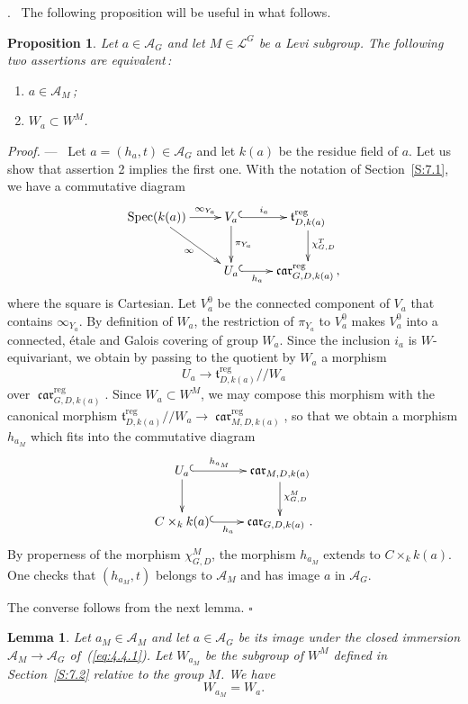\documentclass[12pt,a4paper,oneside,english,leqno]{smfart}
\makeatletter
\numberwithin{equation}{subsection}
\newcounter{theo}
\numberwithin{theo}{subsection}
\newenvironment{paragr}[1][]{\medskip\refstepcounter{subsection}%
  \par\noindent\hspace*{\parindent}\thesubsection.\ \emph{#1}%
  \@ifundefined{@empty}{}{}\ignorespaces}{\medskip}
\theoremstyle{plain}
\newtheorem{lemma}[theo]{Lemma}
\newtheorem{proposition}[theo]{Proposition}
\theoremstyle{definition}
\theoremstyle{remark}
\newenvironment{preuve}[1][]{\medskip\noindent\textit{Proof.} #1 ---\ }%
  {\hfill\ensuremath{\square}\medskip}
\DeclareMathOperator{\reg}{reg}
\DeclareMathOperator{\Spec}{Spec}
\DeclareMathOperator{\car}{\mathfrak{car}}
\newcommand{\lc}{\mathcal{L}}
\newcommand{\Ac}{\mathcal{A}}
\newcommand{\tgo}{\mathfrak{t}}
\makeatother
\begin{document}
\begin{paragr}\label{S:8.2}
The following proposition will be useful in what follows.

\begin{proposition}\label{thm:8.2.1}
Let $a\in\Ac_G$ and let $M\in\lc^G$ be a Levi subgroup. The following two assertions are equivalent\,:
\begin{enumerate}
\item $a\in\Ac_M$\,; \item $W_a\subset W^M$.
\end{enumerate}
\end{proposition}

\begin{preuve}
Let $a=(h_a,t)\in\Ac_G$ and let $k(a)$ be the residue field of $a$. Let us show that assertion 2 implies the first one. With the notation of Section~\ref{S:7.1}, we have a commutative diagram
\begin{equation}\label{eq:8.2.1}
\xymatrix{
\Spec(k(a))\ar[r]^-{\infty_{Y_a}}\ar[dr]_-{\infty} & V_a\ar@{^{(}->}[r]^-{i_a}\ar[d]^{\pi_{Y_a}} & \tgo^{\reg}_{D,k(a)}\ar[d]^{\chi^T_{G,D}}\\
& U_a\ar@{^{(}->}[r]_-{h_a} & \car^{\reg}_{G,D,k(a)}\,,
}
\end{equation}
where the square is Cartesian. Let $V_a^0$ be the connected component of $V_a$ that contains $\infty_{Y_a}$. By definition of $W_a$, the restriction of $\pi_{Y_a}$ to $V_a^0$ makes $V_a^0$ into a connected, étale and Galois covering of group $W_a$. Since the inclusion $i_a$ is $W$-equivariant, we obtain by passing to the quotient by $W_a$ a morphism
$$
U_a\to\tgo^{\reg}_{D,k(a)}//W_a
$$
over $\car^{\reg}_{G,D,k(a)}$. Since $W_a\subset W^M$, we may compose this morphism with the canonical morphism $\tgo^{\reg}_{D,k(a)}//W_a\to\car^{\reg}_{M,D,k(a)}$, so that we obtain a morphism $h_{a_M}$ which fits into the commutative diagram
$$
\xymatrix{
U_a\ar@{^{(}->}[r]^-{h_{a_M}}\ar[d] & \car_{M,D,k(a)}\ar[d]^{\chi^M_{G,D}}\\
C\times_k k(a)\ar@{^{(}->}[r]_-{h_a} & \car_{G,D,k(a)}\,. }
$$
By properness of the morphism $\chi^M_{G,D}$, the morphism $h_{a_M}$ extends to $C\times_k k(a)$. One checks that $(h_{a_M},t)$ belongs to $\Ac_M$ and has image $a$ in $\Ac_G$.

The converse follows from the next lemma.
\end{preuve}

\begin{lemma}\label{thm:8.2.2}
Let $a_M\in\Ac_M$ and let $a\in\Ac_G$ be its image under the closed immersion $\Ac_M\to\Ac_G$ of~(\ref{eq:4.4.1}). Let $W_{a_M}$ be the subgroup of $W^M$ defined in Section~\ref{S:7.2} relative to the group $M$. We have
$$
W_{a_M}=W_a.
$$
\end{lemma}


\end{paragr}
\end{document}
